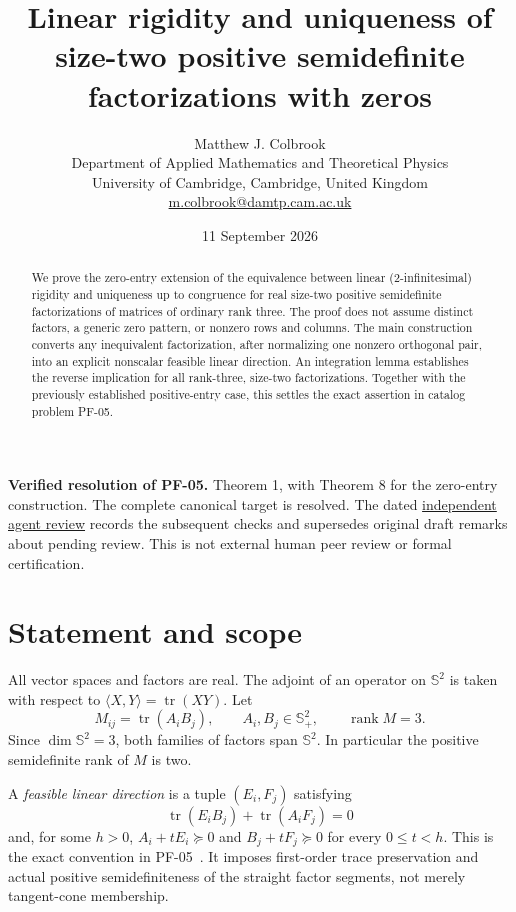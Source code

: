 \documentclass[11pt]{article}
\title{Linear rigidity and uniqueness of size-two positive semidefinite factorizations with zeros}
\author{Matthew J. Colbrook\\\small Department of Applied Mathematics and Theoretical Physics\\\small University of Cambridge, Cambridge, United Kingdom\\\small\href{mailto:m.colbrook@damtp.cam.ac.uk}{m.colbrook@damtp.cam.ac.uk}}
\date{11 September 2026}
\newcommand{\Sym}{\mathbb S^2}
\newcommand{\PSD}{\mathbb S^2_+}
\newcommand{\tr}{\operatorname{tr}}
\newcommand{\rank}{\operatorname{rank}}
\begin{document}
\maketitle

\noindent\textbf{Verified resolution of PF-05.} Theorem 1, with Theorem 8 for the zero-entry construction. The complete canonical target is resolved.
The dated \href{https://github.com/MColbrook/OpenProblemsInNLA/blob/codex/colbrook-factorization-resolutions/references/colbrook-factorization-2026-09-11/verification/reviews/PF-05-review.md}{independent agent review} records the subsequent checks and supersedes original draft remarks about pending review. This is not external human peer review or formal certification.
\par\medskip

\begin{abstract}
We prove the zero-entry extension of the equivalence between linear (2-infinitesimal) rigidity and uniqueness up to congruence for real size-two positive semidefinite factorizations of matrices of ordinary rank three. The proof does not assume distinct factors, a generic zero pattern, or nonzero rows and columns. The main construction converts any inequivalent factorization, after normalizing one nonzero orthogonal pair, into an explicit nonscalar feasible linear direction. An integration lemma establishes the reverse implication for all rank-three, size-two factorizations. Together with the previously established positive-entry case, this settles the exact assertion in catalog problem PF-05.
\end{abstract}

\section{Statement and scope}
All vector spaces and factors are real. The adjoint of an operator on $\Sym$ is taken with respect to $\langle X,Y\rangle=\tr(XY)$. Let
\[
M_{ij}=\tr(A_iB_j),\qquad A_i,B_j\in\PSD,
\qquad \rank M=3.
\]
Since $\dim\Sym=3$, both families of factors span $\Sym$. In particular the positive semidefinite rank of $M$ is two.

A \emph{feasible linear direction} is a tuple $(E_i,F_j)$ satisfying
\[
\tr(E_iB_j)+\tr(A_iF_j)=0
\]
and, for some $h>0$, $A_i+tE_i\succeq0$ and $B_j+tF_j\succeq0$ for every $0\leq t<h$. This is the exact convention in PF-05~\cite{catalog}. It imposes first-order trace preservation and actual positive semidefiniteness of the straight factor segments, not merely tangent-cone membership.
\end{document}
